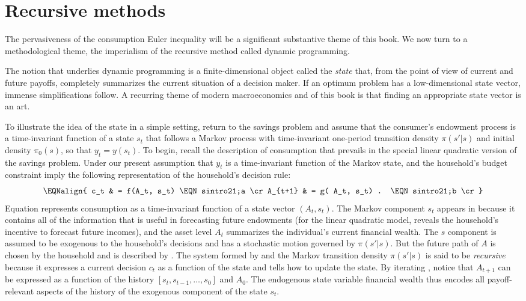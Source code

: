 \section{Recursive methods}
 The pervasiveness  of the consumption Euler inequality will be a
significant substantive theme of this book. We now turn to a
methodological theme, the imperialism of  the recursive method
called dynamic programming.

The notion that underlies dynamic programming
is a finite-dimensional object called the
{\it state\/} that,
from the point of view of current and future payoffs,
 completely summarizes the current situation
of a decision maker.
If an optimum problem has a low-dimensional state vector,
immense simplifications follow.  A recurring theme of modern macroeconomics
and of this book is that
finding an appropriate state vector is an art.

To illustrate the idea of the state in  a simple setting,
  return to the savings problem and assume that the
consumer's endowment process is a time-invariant function
of a state $s_t$ that follows a Markov process with time-invariant one-period
transition density $\pi(s'|s)$ and initial  density $\pi_0(s)$,
 so that $y_t = y(s_t)$.
To begin, recall the description
of consumption
that prevails
 in the special linear quadratic version of the savings problem. Under our
present assumption that $y_t$ is a time-invariant function of the Markov
state,  and the household's budget constraint imply
the following representation of the household's decision rule:
$$\EQNalign{ c_t & =   f(A_t, s_t) \EQN sintro21;a \cr
             A_{t+1} & =  g( A_t, s_t) . \EQN sintro21;b \cr} $$
Equation  represents consumption  as a
time-invariant function of a state vector $(A_t, s_t)$.  The Markov
component $s_t$ appears in
 because it contains all of the information
that is useful in forecasting future endowments (for the linear quadratic
model,  reveals the household's incentive to forecast future
incomes),  and the asset level $A_t$ summarizes the individual's current financial
wealth. The $s$ component is assumed to be
exogenous to the   household's decisions
and has a stochastic motion governed by $\pi(s'|s)$.
But the future path of $A$ is chosen by the household and is described
by . The system formed by  and the Markov
transition density $\pi(s'|s)$ is said to be {\it recursive\/}
 because
it expresses a current decision $c_t$ as a function  of the state and tells how
to update  the state.
By iterating ,
notice that $A_{t+1}$ can be expressed as a function of
the history  $[s_t, s_{t-1}, \ldots,
s_0]$
and $A_0$. The endogenous state variable financial wealth thus
encodes all payoff-relevant aspects of the history of the
exogenous component of the state $s_t$.

